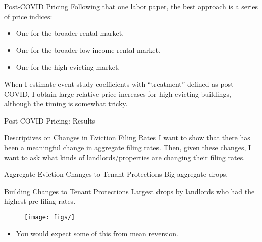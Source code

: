 \documentclass[aspectratio=169]{beamer}
\begin{document}
\begin{frame}{Post-COVID Pricing}
Following that one labor paper, the best approach is a series of price indices:
\begin{itemize}
  \item One for the broader rental market.
  \item One for the broader low-income rental market.
  \item One for the high-evicting market.
\end{itemize}

When I estimate event-study coefficients with “treatment” defined as post-COVID, I obtain large relative price increases for high-evicting buildings, although the timing is somewhat tricky.
\end{frame}


\begin{frame}{Post-COVID Pricing: Results}
\begin{figure}
  \fbox{\rule{0pt}{2.2in}\rule{0.95\linewidth}{0pt}}
\end{figure}
\end{frame}


\begin{frame}{Descriptives on Changes in Eviction Filing Rates}
I want to show that there has been a meaningful change in aggregate filing rates. Then, given these changes, I want to ask what kinds of landlords/properties are changing their filing rates.
\end{frame}


\begin{frame}{Aggregate Eviction Changes to Tenant Protections}
Big aggregate drops.

\medskip
\begin{figure}
  \fbox{\rule{0pt}{2.2in}\rule{0.95\linewidth}{0pt}}
\end{figure}
\end{frame}


\begin{frame}{Building Changes to Tenant Protections}
Largest drops by landlords who had the highest pre-filing rates.

\medskip
\begin{figure}
  \texttt{[image: figs/]}
  \fbox{\rule{0pt}{2.2in}\rule{0.95\linewidth}{0pt}}
\end{figure}

\begin{itemize}
  \item You would expect some of this from mean reversion.
\end{itemize}
\end{frame}
\end{document}
